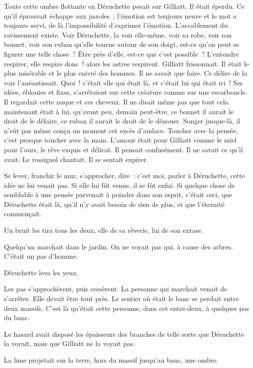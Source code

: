 \documentclass[french,twoside]{book} %
\begin{document}
Toute cette ombre flottante en Déruchette pesait  sur Gilliatt. Il était éperdu. Ce qu’il éprouvait échappe aux paroles ; l’émotion est toujours neuve et le mot a toujours servi, de là l’impossibilité d’exprimer l’émotion. L’accablement du ravissement existe. Voir Déruchette, la voir elle-même, voir sa robe, voir son bonnet, voir son ruban qu’elle tourne autour de son doigt, est-ce qu’on peut se figurer une telle chose ? Être près d’elle, est-ce que c’est possible ? L’entendre respirer, elle respire donc ! alors les astres respirent. Gilliatt frissonnait. Il était le plus misérable et le plus enivré des hommes. Il ne savait que faire. Ce délire de la voir l’anéantissait. Quoi ! c’était elle qui était là, et c’était lui qui était ici ! Ses idées, éblouies et fixes, s’arrêtaient sur cette créature comme sur une escarboucle. Il regardait cette nuque et ces cheveux. Il ne disait même pas que tout cela maintenant était à lui, qu’avant peu, demain peut-être, ce bonnet il aurait le droit de le défaire, ce ruban il aurait le droit de le dénouer. Songer jusque-là, il n’eût pas même conçu un moment cet excès d’audace. Toucher avec la pensée, c’est presque toucher avec la main. L’amour était pour Gilliatt comme le miel pour l’ours, le rêve exquis et délicat. Il pensait confusément. Il ne savait ce qu’il avait. Le rossignol chantait. Il se sentait expirer.\par
Se lever, franchir le mur, s’approcher, dire : c’est moi, parler à Déruchette, cette idée ne lui venait pas. Si elle lui fût venue, il se fût enfui. Si quelque chose de semblable à une pensée parvenait à poindre dans son esprit, c’était ceci, que Déruchette était là, qu’il n’y avait besoin de rien de plus, et que l’éternité commençait.\par
 Un bruit les tira tous les deux, elle de sa rêverie, lui de son extase.\par
Quelqu’un marchait dans le jardin. On ne voyait pas qui, à cause des arbres. C’était un pas d’homme.\par
Déruchette leva les yeux.\par
Les pas s’approchèrent, puis cessèrent. La personne qui marchait venait de s’arrêter. Elle devait être tout près. Le sentier où était le banc se perdait entre deux massifs. C’est là qu’était cette personne, dans cet entre-deux, à quelques pas du banc.\par
Le hasard avait disposé les épaisseurs des branches de telle sorte que Déruchette la voyait, mais que Gilliatt ne la voyait pas.\par
La lune projetait sur la terre, hors du massif jusqu’au banc, une ombre.\par
\end{document}
